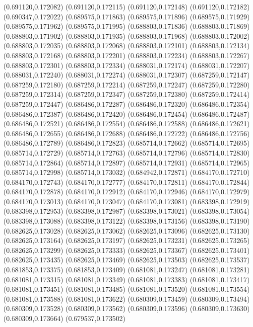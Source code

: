 (0.691120,0.172082)
(0.691120,0.172115)
(0.691120,0.172148)
(0.691120,0.172182)
(0.690347,0.172022)
(0.689575,0.171863)
(0.689575,0.171896)
(0.689575,0.171929)
(0.689575,0.171962)
(0.689575,0.171995)
(0.688803,0.171836)
(0.688803,0.171869)
(0.688803,0.171902)
(0.688803,0.171935)
(0.688803,0.171968)
(0.688803,0.172002)
(0.688803,0.172035)
(0.688803,0.172068)
(0.688803,0.172101)
(0.688803,0.172134)
(0.688803,0.172168)
(0.688803,0.172201)
(0.688803,0.172234)
(0.688803,0.172267)
(0.688803,0.172301)
(0.688803,0.172334)
(0.688031,0.172174)
(0.688031,0.172207)
(0.688031,0.172240)
(0.688031,0.172274)
(0.688031,0.172307)
(0.687259,0.172147)
(0.687259,0.172180)
(0.687259,0.172214)
(0.687259,0.172247)
(0.687259,0.172280)
(0.687259,0.172314)
(0.687259,0.172347)
(0.687259,0.172380)
(0.687259,0.172414)
(0.687259,0.172447)
(0.686486,0.172287)
(0.686486,0.172320)
(0.686486,0.172354)
(0.686486,0.172387)
(0.686486,0.172420)
(0.686486,0.172454)
(0.686486,0.172487)
(0.686486,0.172521)
(0.686486,0.172554)
(0.686486,0.172588)
(0.686486,0.172621)
(0.686486,0.172655)
(0.686486,0.172688)
(0.686486,0.172722)
(0.686486,0.172756)
(0.686486,0.172789)
(0.686486,0.172823)
(0.685714,0.172662)
(0.685714,0.172695)
(0.685714,0.172729)
(0.685714,0.172763)
(0.685714,0.172796)
(0.685714,0.172830)
(0.685714,0.172864)
(0.685714,0.172897)
(0.685714,0.172931)
(0.685714,0.172965)
(0.685714,0.172998)
(0.685714,0.173032)
(0.684942,0.172871)
(0.684170,0.172710)
(0.684170,0.172743)
(0.684170,0.172777)
(0.684170,0.172811)
(0.684170,0.172844)
(0.684170,0.172878)
(0.684170,0.172912)
(0.684170,0.172946)
(0.684170,0.172979)
(0.684170,0.173013)
(0.684170,0.173047)
(0.684170,0.173081)
(0.683398,0.172919)
(0.683398,0.172953)
(0.683398,0.172987)
(0.683398,0.173021)
(0.683398,0.173054)
(0.683398,0.173088)
(0.683398,0.173122)
(0.683398,0.173156)
(0.683398,0.173190)
(0.682625,0.173028)
(0.682625,0.173062)
(0.682625,0.173096)
(0.682625,0.173130)
(0.682625,0.173164)
(0.682625,0.173197)
(0.682625,0.173231)
(0.682625,0.173265)
(0.682625,0.173299)
(0.682625,0.173333)
(0.682625,0.173367)
(0.682625,0.173401)
(0.682625,0.173435)
(0.682625,0.173469)
(0.682625,0.173503)
(0.682625,0.173537)
(0.681853,0.173375)
(0.681853,0.173409)
(0.681081,0.173247)
(0.681081,0.173281)
(0.681081,0.173315)
(0.681081,0.173349)
(0.681081,0.173383)
(0.681081,0.173417)
(0.681081,0.173451)
(0.681081,0.173485)
(0.681081,0.173520)
(0.681081,0.173554)
(0.681081,0.173588)
(0.681081,0.173622)
(0.680309,0.173459)
(0.680309,0.173494)
(0.680309,0.173528)
(0.680309,0.173562)
(0.680309,0.173596)
(0.680309,0.173630)
(0.680309,0.173664)
(0.679537,0.173502)
